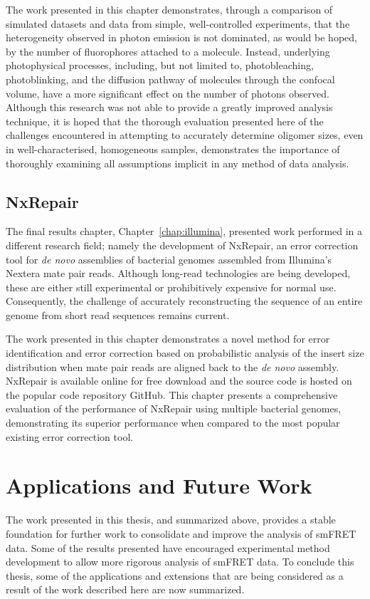 The work presented in this chapter demonstrates, through a comparison of simulated datasets and data from simple, well-controlled experiments, that the heterogeneity observed in photon emission is not dominated, as would be hoped, by the number of fluorophores attached to a molecule. Instead, underlying photophysical processes, including, but not limited to, photobleaching, photoblinking, and the diffusion pathway of molecules through the confocal volume, have a more significant effect on the number of photons observed. Although this research was not able to provide a greatly improved analysis technique, it is hoped that the thorough evaluation presented here of the challenges encountered in attempting to accurately determine oligomer sizes, even in well-characterised, homogeneous samples, demonstrates the importance of thoroughly examining all assumptions implicit in any method of data analysis.   

\subsection{NxRepair}
The final results chapter, Chapter~\ref{chap:illumina}, presented work performed in a different research field; namely the development of NxRepair, an error correction tool for \emph{de novo} assemblies of bacterial genomes assembled from Illumina's Nextera mate pair reads. Although long-read technologies are being developed, these are either still experimental or prohibitively expensive for normal use. Consequently, the challenge of accurately reconstructing the sequence of an entire genome from short read sequences remains current. 

The work presented in this chapter demonstrates a novel method for error identification and error correction based on probabilistic analysis of the insert size distribution when mate pair reads are aligned back to the \emph{de novo} assembly. NxRepair is available online for free download and the source code is hosted on the popular code repository GitHub.  This chapter presents a comprehensive evaluation of the performance of NxRepair using multiple bacterial genomes, demonstrating its superior performance when compared to the most popular existing error correction tool.

\section{Applications and Future Work}
The work presented in this thesis, and summarized above, provides a stable foundation for further work to consolidate and improve the analysis of smFRET data. Some of the results presented have encouraged experimental method development to allow more rigorous analysis of smFRET data. To conclude this thesis, some of the applications and extensions that are being considered as a result of the work described here are now summarized. 

